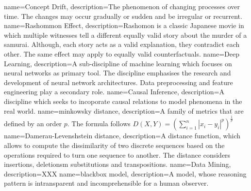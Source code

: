 {
        name=Concept Drift,
        description={The phenomenon of changing processes over time. The changes may occur gradually or sudden and be irregular or recurrent.}
}
{
        name=Rashommon Effect,
        description={Rashomon is a classic Japanese movie in which multiple witnesses tell a different equally valid story about the murder of a samurai. Although, each story acts as a valid explanation, they contradict each other. The same effect may apply to equally valid counterfactuals.}
}
{
        name=Deep Learning,
        description={A sub-discipline of machine learning which focuses on neural networks as primary tool. The discipline emphasises the research and development of neural network architectures. Data preprocessing and feature engineering play a secondary role.}
}
{
        name=Causal Inference,
        description={A discipline which seeks to incoporate causal relations to model phenomena in the real world.}
}
{
        name=minkowsky distance,
        description={A family of metrics that are defined by an order $p$. The formula follows $D(X, Y)=\left(\sum_{i=1}^{n}\left|x_{i}-y_{i}\right|^{p}\right)^{\frac{1}{p}}$}
}
{
        name=Damerau-Levenshstein distance,
        description={A distance function, which allows to compute the dissimilarity of two discrete sequences based on the operations required to turn one sequence to another. The distance considers insertions, deletionsm substitutions and transpositions.}
}
{
        name=Data Mining,
        description={XXX}
}
{
        name=blackbox model,
        description={A model, whose reasoning pattern is intransparent and incomprehensible for a human observer.}
}

